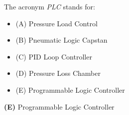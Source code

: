 

The acronym {\it PLC} stands for:

\begin{itemize}
\item{(A)} Pressure Load Control
\vskip 5pt 
\item{(B)} Pneumatic Logic Capstan
\vskip 5pt 
\item{(C)} PID Loop Controller
\vskip 5pt 
\item{(D)} Pressure Loss Chamber
\vskip 5pt 
\item{(E)} Programmable Logic Controller
\end{itemize}







{\bf (E)} Programmable Logic Controller
 










